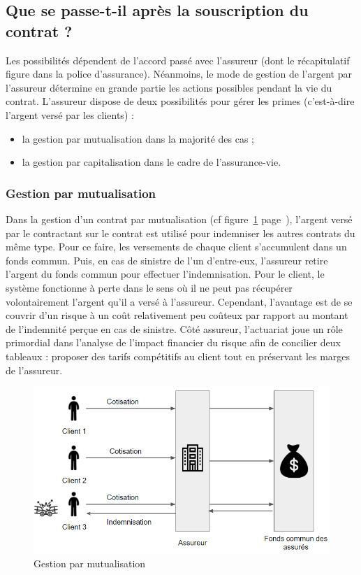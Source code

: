 \documentclass{article}
\begin{document}
\subsection{Que se passe-t-il après la souscription du contrat ?}
Les possibilités dépendent de l'accord passé avec l'assureur (dont le récapitulatif figure dans la police d'assurance). Néanmoins, le mode de gestion de l'argent par l'assureur détermine en grande partie les actions possibles pendant la vie du contrat. L'assureur dispose de deux possibilités pour gérer les primes (c'est-à-dire l'argent versé par les clients) :

\begin{itemize}
    \item la gestion par mutualisation dans la majorité des cas ;
    \item la gestion par capitalisation dans le cadre de l'assurance-vie.
\end{itemize}

\subsubsection{Gestion par mutualisation}
Dans la gestion d'un contrat par mutualisation (cf figure~\ref{gestion_mutualisation} page~\pageref{gestion_mutualisation}), l'argent versé par le contractant sur le contrat est utilisé pour indemniser les autres contrats du même type. Pour ce faire, les versements de chaque client s'accumulent dans un fonds commun. Puis, en cas de sinistre de l'un d'entre-eux, l'assureur retire l'argent du fonds commun pour effectuer l'indemnisation. Pour le client, le système fonctionne à perte dans le sens où il ne peut pas récupérer volontairement l'argent qu'il a versé à l'assureur. Cependant, l'avantage est de se couvrir d'un risque à un coût relativement peu coûteux par rapport au montant de l'indemnité perçue en cas de sinistre. Côté assureur, l'actuariat joue un rôle primordial dans l'analyse de l'impact financier du risque afin de concilier deux tableaux : proposer des tarifs compétitifs au client tout en préservant les marges de l'assureur.

\begin{figure}[h!]
    \includegraphics[width=\textwidth]{gestion_mutualisation.PNG}
    \caption{
        \label{gestion_mutualisation} Gestion par mutualisation
    }
\end{figure}
\end{document}
